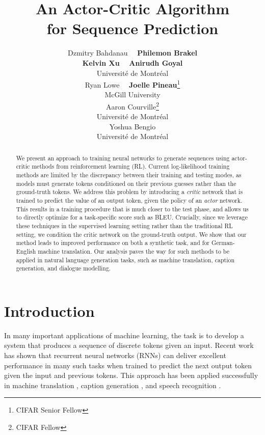 \documentclass{article} %
\title{An Actor-Critic Algorithm\\
       for Sequence Prediction}
\author{Dzmitry Bahdanau~  ~\textbf{Philemon Brakel} \\ 
        \textbf{Kelvin Xu}~ ~\textbf{Anirudh Goyal} \\ 
        Universit\'e de Montr\'eal \\
        \And
        Ryan Lowe~ ~\textbf{Joelle Pineau}\thanks{CIFAR Senior Fellow} \\
        McGill University \\
        \AND
        Aaron Courville\thanks{CIFAR Fellow}\\
        Universit\'e de Montr\'eal \\
        \And
        \hspace{52mm}Yoshua Bengio\footnotemark[1] \\
        \hspace{52mm}Universit\'e de Montr\'eal
}
\begin{document}
\maketitle

\begin{abstract}
    We present an approach to training neural networks to generate sequences using actor-critic methods from reinforcement learning (RL).
    Current log-likelihood training methods are limited by the discrepancy between their training and testing modes, 
    as models must generate tokens conditioned on their previous guesses rather
    than the ground-truth tokens. 
    We address this problem by introducing a \textit{critic} network that is trained to predict the value of an output token, given the policy of an \textit{actor} network.
    This results in a training procedure that is much closer to the test phase, and allows us to directly optimize for a task-specific score such as BLEU.
    Crucially, since we leverage these techniques in the supervised learning
    setting rather than the traditional RL setting, we condition the critic
    network on the ground-truth output.
    We show that our method leads to improved performance on both a synthetic task, and for German-English machine translation.
 Our analysis paves the way for such methods to be applied in natural 
 language generation tasks, such as machine translation, caption generation, and dialogue modelling.
\end{abstract}

\section{Introduction}

In many important applications of machine learning, the task is to develop a
system that produces a sequence of discrete tokens given an input. Recent work
has shown that recurrent neural networks (RNNs) can deliver excellent
performance in many such tasks when trained to predict the next output token
given the input and previous tokens. This approach has been applied successfully in machine translation
\citep{sutskever2014sequence,bahdanau2015neural}, caption generation
\citep{kiros2014unifying,donahue2015long,vinyals2015show,xu2015show,karpathy2015deep}, and speech recognition 
\citep{chorowski2015attention,chan2015listen}. 
\end{document}
